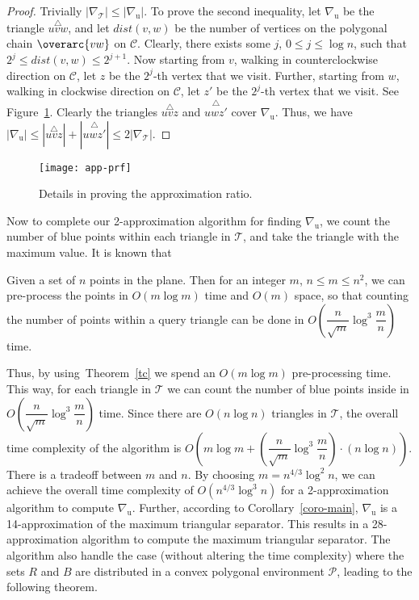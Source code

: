 \documentclass[a4paper,UKenglish]{lipics-v2018}
\theoremstyle{definition}
\begin{document}
\begin{proof}
Trivially $|\nabla_{\mathcal T}| \leq |\nabla_\mathrm{u}|$. To prove the second inequality, let $\nabla_\mathrm{u}$ be the triangle $\overset{\triangle}{u v w}$, and let $dist(v, w)$ be the number of vertices on the polygonal chain $\overarc{vw}$ on $\mathcal C$. Clearly, there exists some $j$, $0 \leq j \leq \log n$, such that $2^j \leq dist(v,w) \leq 2^{j+1}$. Now starting from $v$, walking in counterclockwise direction on $\mathcal C$, let $z$ be the $2^j$-th vertex that we visit. Further, starting from $w$, walking in clockwise direction on $\mathcal C$, let $z'$ be the $2^{j}$-th vertex that we visit. See Figure~\ref{app-prf}. Clearly the triangles $\overset{\triangle}{u v z}$ and $\overset{\triangle}{uwz'}$ cover $\nabla_\mathrm{u}$. Thus, we have
 $|\nabla_\mathrm{u}| \leq |\overset{\triangle}{uvz}|+|\overset{\triangle}{uwz'}| \leq 2 |\nabla_{\mathcal T}|$.
\end{proof}

\begin{figure}[h]
\centering
\texttt{[image: app-prf]}
\caption{Details in proving the approximation ratio.}
\label{app-prf}
\end{figure}

Now to complete our 2-approximation algorithm for finding $\nabla_\mathrm{u}$, we count the number of blue points within each triangle in $\mathcal T$, and take the triangle with the maximum value. It is known that

\begin{theorem}
\cite{cg-book}
\label{tc}
Given a set of $n$ points in the plane. Then for an integer $m$, $n\leq m\leq n^2$, we can pre-process the points in $O(m\log m)$ time and $O(m)$ space, so that counting the number of points within a query triangle can be done in
  $O(\dfrac{n}{\sqrt{m}}\log^3 \dfrac{m}{n})$ time.
\end{theorem}

Thus, by using~Theorem~\ref{tc} we spend an $O(m\log m)$ pre-processing time. This way, for each triangle in $\mathcal T$ we can count the number of blue points inside in $O(\dfrac{n}{\sqrt{m}}\log^3 \dfrac{m}{n})$ time. Since there are $O(n \log n)$ triangles in $\mathcal T$, the overall time complexity of the algorithm is
$O(m\log m + (\dfrac{n}{\sqrt{m}}\log^3 \dfrac{m}{n}) \cdot (n \log n))$. There is a tradeoff between $m$ and $n$. By choosing $m = n^{4/3} \log^2 n$, we can achieve the overall time complexity of $O(n^{4/3} \log^3 n)$ for a 2-approximation algorithm to compute $\nabla_\mathrm{u}$. Further, according to Corollary~\ref{coro-main}, $\nabla_\mathrm{u}$ is a 14-approximation of the maximum triangular separator. This results in a 28-approximation algorithm to compute the maximum triangular separator. The algorithm also handle the case (without altering the time complexity) where the sets $R$ and $B$ are distributed in a convex polygonal environment $\mathcal P$, leading to the following theorem.
\end{document}
